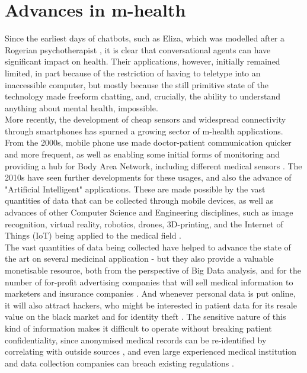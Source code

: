 \section{Advances in m-health}
Since the earliest days of chatbots, such as Eliza, which was modelled after a Rogerian psychotherapist \cite{weizenbaum1966eliza}, it is clear that conversational agents can have significant impact on health. Their applications, however, initially remained limited, in part because of the restriction of having to teletype into an inaccessible computer, but mostly because the still primitive state of the technology made freeform chatting, and, crucially, the ability to understand anything about mental health, impossible. \\
More recently, the development of cheap sensors and widespread connectivity through smartphones has spurned a growing sector of m-health applications. From the 2000s, mobile phone use made doctor-patient communication quicker and more frequent, as well as enabling some initial forms of monitoring and providing a hub for Body Area Network, including different medical sensors \cite{Patrick2008}. The 2010s have seen further developments for these usages, and also the advance of "Artificial Intelligent" applications. These are made possible by the vast quantities of data that can be collected through mobile devices, as well as advances of other Computer Science and Engineering disciplines, such as image recognition, virtual reality, robotics, drones, 3D-printing, and the Internet of Things (IoT) being applied to the medical field \cite{Pistorius2017}. \\
The vast quantities of data being collected have helped to advance the state of the art on several medicinal application - but they also provide a valuable monetisable resource, both from the perspective of Big Data analysis, and for the number of for-profit advertising companies that will sell medical information to marketers and insurance companies \cite{tanner2016}. And whenever personal data is put online, it will also attract hackers, who might be interested in patient data for its resale value on the black market and for identity theft \cite{hackercare}. The sensitive nature of this kind of information makes it difficult to operate without breaking patient confidentiality, since anonymised medical records can be re-identified by correlating with outside sources \cite{Sweeney2001}, and even large experienced medical institution and data collection companies can breach existing regulations \cite{deepmindnhs}. 
